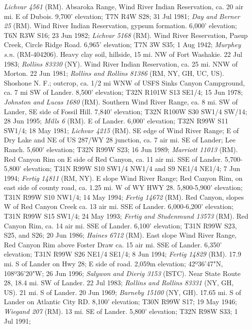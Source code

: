 \textit{Lichvar 4561} (RM).
Absaroka Range, Wind River Indian Reservation, ca. 20 air mi. E of Dubois.
9,700' elevation; T7N R4W S28; 31 Jul 1981; \textit{Day and Berner 25} (RM).
Wind River Indian Reservation, gypsum formation. 6,000' elevation; T6N R3W S16;
23 Jun 1982; \textit{Lichvar 5168} (RM).
Wind River Reservation, Pasup Creek, Circle Ridge Road. 6,965' elevation;
T7N 3W S35; 1 Aug 1942; \textit{Murphey s.n.} (RM-404206).
Heavy clay soil, hillside, 15 mi. NW of Fort Washakie. 22 Jul 1983;
\textit{Rollins 83330} (NY).
Wind River Indian Reservation, ca. 25 mi. NNW of Morton. 22 Jun 1981;
\textit{Rollins and Rollins 81386} (RM, NY, GH, UC, US).
Shoshone N. F.; outcrop, ca. 1/2 mi WNW of USFS Sinks Canyon Campground, ca.
7 mi SW of Lander. 8,500' elevation; T32N R101W S13 SE1/4; 15 Jun 1978;
\textit{Johnston and Lucas 1680} (RM).
Southern Wind River Range, ca. 8 mi. SW of Lander, SE side of Fossil Hill.
7,840' elevation; T32N R100W S30 SW1/4 SW/14; 28 Jun 1995;
\textit{Mills 6} (RM).
E of Lander. 6,000' elevation; T32N R99W S11 SW1/4; 18 May 1981;
\textit{Lichvar 4215} (RM).
SE edge of Wind River Range; E of Dry Lake and NE of US 287/WY 28 junction, ca.
7 air mi. SE of Lander; Lee Ranch. 5,600' elevation; T32N R99W S23; 16 Jun 1989;
\textit{Marriott 11013} (RM).
Red Canyon Rim on E side of Red Canyon, ca. 11 air mi. SSE of Lander.
5,700-5,800' elevation; T31N R99W S10 SW1/4 NW1/4 and S9 NE1/4 NE1/4;
7 Jun 1994; \textit{Fertig 14811} (RM, NY).
E slope Wind River Range; Red Canyon Rim, on east side of county road, ca. 1.25
mi. W of WY HWY 28. 5,800-5,900' elevation; T31N R99W S10 NW1/4; 14 May 1994;
\textit{Fertig 14672} (RM).
Red Canyon, slopes W of Red Canyon Creek ca. 13 air mi. SSE of Lander.
6,000-6,200' elevation; T31N R99W S15 SW1/4; 24 May 1993;
\textit{Fertig and Studenmund 13573} (RM).
Red Canyon Rim, ca. 14 air mi. SSE of Lander. 6,100' elevation; T31N R99W S23,
S25, and S26; 20 Jun 1986; \textit{Haines 6712} (RM).
East slope Wind River Range, Red Canyon Rim above Foster Draw ca. 15 air mi. SSE
of Lander.  6,350' elevation; T31N R99W S26 NE1/4 SE1/4; 8 Jun 1994;
\textit{Fertig 14829} (RM).
17.9 mi. S of Lander on Hwy 28; E side of road. 2,059m elevation;
42º36'47"N, 108º36'20"W; 26 Jun 1996; \textit{Salywon and Dierig 3153} (ISTC).
Near State Route 28, 18.4 mi. SW of Lander. 22 Jul 1983;
\textit{Rollins and Rollins 83331} (NY, GH, US).
21 mi. S of Lander. 20 Jun 1969; \textit{Barneby 15100} (NY, GH).
17.65 mi. S of Lander on Atlantic City RD. 8,100' elevation; T30N R99W S17;
19 May 1946; \textit{Wiegand 207} (RM).
13 mi. SE of Lander. 5,800' elevation; T32N R98W S33; 1 Jul 1991;
